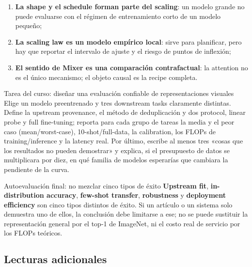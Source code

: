 \documentclass[a4paper]{article}
\begin{document}
\begin{enumerate}
  \item \textbf{La shape y el schedule forman parte del scaling}: un modelo grande no puede evaluarse con el régimen de entrenamiento corto de un modelo pequeño;
  \item \textbf{La scaling law es un modelo empírico local}: sirve para planificar, pero hay que reportar el intervalo de ajuste y el riesgo de puntos de inflexión;
  \item \textbf{El sentido de Mixer es una comparación contrafactual}: la attention no es el único mecanismo; el objeto causal es la recipe completa.
\end{enumerate}

\begin{importantbox}{Tarea del curso: diseñar una evaluación confiable de representaciones visuales}
Elige un modelo preentrenado y tres downstream tasks claramente distintas. Define la upstream provenance, el método de deduplicación y dos protocol, linear probe y full fine-tuning; reporta para cada grupo de tareas la media y el peor caso (mean/worst-case), 10-shot/full-data, la calibration, los FLOPs de training/inference y la latency real. Por último, escribe al menos tres «cosas que los resultados no pueden demostrar» y explica, si el presupuesto de datos se multiplicara por diez, en qué familia de modelos esperarías que cambiara la pendiente de la curva.
\end{importantbox}

\begin{warningbox}{Autoevaluación final: no mezclar cinco tipos de éxito}
\textbf{Upstream fit}, \textbf{in-distribution accuracy}, \textbf{few-shot transfer}, \textbf{robustness} y \textbf{deployment efficiency} son cinco tipos distintos de éxito. Si un artículo o un sistema solo demuestra uno de ellos, la conclusión debe limitarse a ese; no se puede sustituir la representación general por el top-1 de ImageNet, ni el costo real de servicio por los FLOPs teóricos.
\end{warningbox}

\subsection{Lecturas adicionales}
\end{document}
